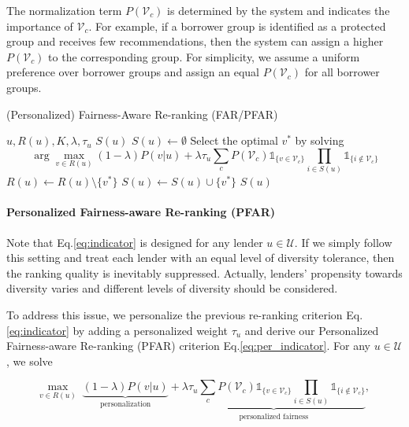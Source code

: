 The normalization term $P(\mathcal V_c)$ is determined by the system and indicates the importance of $\mathcal V_c$. For example, if a borrower group is identified as a protected group and receives few recommendations, then the system can assign a higher $P(\mathcal V_c)$ to the corresponding group. For simplicity, we assume a uniform preference over borrower groups and assign an equal $P(\mathcal V_c)$ for all borrower groups.



\begin{algorithm}[t]
\caption{(Personalized) Fairness-Aware Re-ranking (FAR/PFAR)}
\begin{algorithmic}[1]
\REQUIRE $u,R(u),K,\lambda, \tau_u$
\ENSURE $S(u)$
\STATE $S(u)\leftarrow\emptyset$
\STATE Select the optimal $v^*$ by solving $$\arg\max_{v\in R(u)}(1-\lambda)P(v|u)+\lambda\tau_u \sum_{c}P(\mathcal V_c)\mathds{1}_{\{v\in \mathcal V_c\}}\prod_{i\in S(u)}\mathds{1}_{\{i\notin \mathcal V_c\}}$$
\STATE $R(u)\leftarrow R(u)\setminus \{v^*\}$
\STATE $S(u)\leftarrow S(u)\cup\{v^*\}$
\ENDWHILE
\RETURN $S(u)$
\end{algorithmic}
\label{alg:main}
\end{algorithm}


\paragraph{\textbf{Personalized Fairness-aware Re-ranking (PFAR)}}

Note that Eq.\eqref{eq:indicator} is designed for any lender $u\in \mathcal U$. If we simply follow this setting and treat each lender with an equal level of diversity tolerance, then the ranking quality is inevitably suppressed. Actually, lenders' propensity towards diversity varies and different levels of diversity should be considered.

To address this issue, we personalize the previous re-ranking criterion Eq.\eqref{eq:indicator} by adding a personalized weight $\tau_u$ and derive our Personalized Fairness-aware Re-ranking (PFAR) criterion Eq.\eqref{eq:per_indicator}. 
For any $u\in \mathcal U$, we solve

\begin{equation}
\max_{v\in R(u)}\;\underbrace{(1-\lambda)P(v|u)}_{\text{personalization}} + \underbrace{\lambda\tau_u\sum_{c}P(\mathcal V_c)\mathds{1}_{\{v\in \mathcal V_c\}}\prod_{i\in S(u)}\mathds{1}_{\{i\notin \mathcal V_c\}}}_{\text{personalized fairness}},\; %
\label{eq:per_indicator}
\end{equation}

